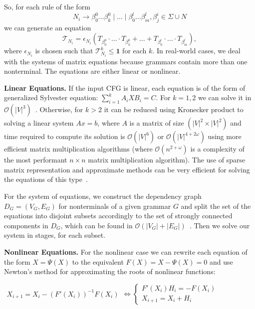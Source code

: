 \documentclass[sigconf]{acmart}
\begin{document}
So, for each rule of the form $$N_i \to \beta^0_0 \dots \beta^0_k \mid \ldots \mid \beta^l_0 \dots \beta^l_m, \beta^i_j \in \Sigma \cup N$$ we can generate an equation
$$\mathcal{T}_{N_i} = \epsilon_{N_i}(T_{\beta^0_0}\cdot \ldots \cdot T_{\beta^0_k} + \ldots + T_{\beta^l_0}\cdot \ldots \cdot T_{\beta^l_m}), $$ where $\epsilon_{N_i}$ is chosen such that $\mathcal{T}_{N_i}^{k} \leq \textbf{1}$ for each $k$.
In real-world cases, we deal with the systems of matrix equations because grammars contain more than one nonterminal.
The equations are either linear or nonlinear.

\textbf{Linear Equations.}
If the input CFG is linear, each equation is of the form of generalized Sylvester equation: $\sum_{i = 1}^{k} A_iXB_i = C$.
For $k = 1, 2$ we can solve it in $\mathcal{O}(|V|^3)$~\cite{Bartels:1972:SME:361573.361582}.
Otherwise, for $k > 2$ it can be reduced using Kronecker product to solving a linear system $Ax = b$, where $A$ is a matrix of size $(|V|^2 \times |V|^2)$ and time required to compute its solution is $\mathcal{O}(|V|^6)$ or $\mathcal{O}(|V|^{4 + 2\omega})$ using more efficient matrix multiplication algorithms (where $\mathcal{O}(n^{2+\omega})$ is a complexity of the most performant $n\times n$ matrix multiplication algorithm).
The use of sparse matrix representation and approximate methods can be very efficient for solving the equations of this type~\cite{bouhamidi2008}.

For the system of equations, we construct the dependency graph $D_G = (V_G, E_G)$ for nonterminals of a given grammar $G$ and split the set of the equations into disjoint subsets accordingly to the set of strongly connected components in $D_G$, which can be found in $\mathcal{O}(|V_G| + |E_G|)$~\cite{tarjan1972}.
Then we solve our system in stages, for each subset.

\textbf{Nonlinear Equations.}
For the nonlinear case we can rewrite each equation of the form $X = \Psi(X)$ to the equivalent $F(X) = X - \Psi(X) = 0$ and use Newton's method  for approximating the roots of nonlinear functions:

\begin{center}

\(
\left.
\begin{array}{c}
X_{i+1} = X_i - (F'(X_i))^{-1}F(X_i)
\end{array}
\right.
\iff
\left\{
\begin{array}{l}
F'(X_i)H_i = - F(X_i) \\
X_{i+1} = X_i + H_i
\end{array}
\right.
\)
\end{center}
\end{document}
